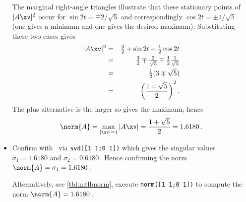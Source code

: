 \begin{example}
\begin{itemize}
The marginal right-angle triangles illustrate that these stationary points of~\(|A\xv|^2\) occur for \(\sin 2t=\mp2/\sqrt5\) and correspondingly \(\cos2t=\pm1/\sqrt5\) (one gives a minimum and one gives the desired maximum).
Substituting these two cases gives
\begin{eqnarray*}
|A\xv|^2&=&\tfrac32+\sin 2t-\tfrac12\cos 2t
\\&=&\tfrac32\mp\tfrac2{\sqrt5}\mp\tfrac12\tfrac1{\sqrt5}
\\&=&\tfrac12(3\mp\sqrt5)
\\&=&\left(\frac{1\mp\sqrt5}2\right)^2.
\end{eqnarray*}
The plus alternative is the larger so gives the maximum, hence
\begin{equation*}
\norm{A}=\max_{|\xv|=1}|A\xv|=\frac{1+\sqrt5}2=1.6180\,.
\end{equation*}
\item Confirm with \script\ via \verb|svd([1 1;0 1])| which gives the singular values \(\sigma_1=1.6180\) and \(\sigma_2=0.6180\)\,.
Hence confirming the norm \(\norm{A}=\sigma_1=1.6180\)\,.

Alternatively, see \cref{tbl:mtlbnorm}, execute \verb|norm([1 1;0 1])| to compute the norm \(\norm{A}=1.6180\)\,.
\end{itemize}
\end{example}




